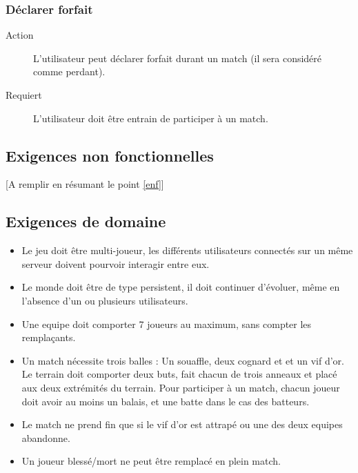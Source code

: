 \documentclass[a4paper]{article}
\begin{document}
\subsubsection{Déclarer forfait}
\begin{description}
\item[Action] L'\gls{utilisateur} peut déclarer forfait durant un match (il sera considéré comme perdant).
\item[Requiert] L'\gls{utilisateur} doit être entrain de participer à un match.
\end{description}


\subsection{Exigences non fonctionnelles}
[A remplir en résumant le point \ref{enf}]


\subsection{Exigences de domaine}
\begin{itemize}
\item Le jeu doit être multi-joueur, les différents \glspl{utilisateur} connectés sur un même \gls{serveur} doivent pourvoir interagir entre eux.
\item Le monde doit être de type persistent, il doit continuer d'évoluer, même en l'absence d'un ou plusieurs \glspl{utilisateur}.
\item Une \gls{equipe} doit comporter 7 \glspl{joueur} au maximum, sans compter les remplaçants.
\item Un match nécessite trois balles : Un souaffle, deux cognard et  et un vif d'or. Le terrain doit comporter deux buts, fait chacun de trois anneaux et placé aux deux extrémités du terrain. Pour participer à un match, chacun \gls{joueur} doit avoir au moins un balais, et une batte dans le cas des batteurs.
\item Le match ne prend fin que si le vif d'or est attrapé ou une des deux \glspl{equipe} abandonne.
\item Un \gls{joueur} blessé/mort ne peut être remplacé en plein match.
\end{itemize}

\end{document}
